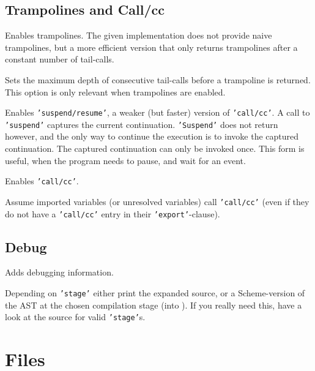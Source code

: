 \subsection{Trampolines and Call/cc}

\begin{Description}
\item[\Opt{--trampoline}] Enables trampolines. The given implementation does
not provide naive trampolines, but a more efficient version that only
returns trampolines after a constant number of tail-calls.
\item[\OptArg{--max-tail-depth}{ depth}] Sets the maximum depth of
consecutive tail-calls before a trampoline is returned. This option is only
relevant when trampolines are enabled.
\item[\Opt{--suspend-resume}] Enables \texttt{'suspend/resume'}, a weaker (but
faster) version of \texttt{'call/cc'}. A call to \texttt{'suspend'} captures the
current continuation. \texttt{'Suspend'} does not return however, and the only
way to continue the execution is to invoke the captured continuation. The
captured continuation can only be invoked once. This form is useful, when the
program needs to pause, and wait for an event.
\item[\Opt{--call/cc}] Enables \texttt{'call/cc'}.
\item[\Opt{--extern-invokes-call/cc}] Assume imported variables (or unresolved
variables) call \texttt{'call/cc'} (even if they do not have a \texttt{'call/cc'}
entry in their \texttt{'export'}-clause).
\end{Description}
\subsection{Debug}

\begin{Description}
\item[\Opt{-g}] Adds debugging information.
\item[\OptArg{-d}{ stage}] Depending on \texttt{'stage'} either print
the expanded source, or a Scheme-version of the AST at the chosen compilation
stage (into ). If you really need this, have a look at the
source for valid \texttt{'stage'}s.
\end{Description}
\section{Files}

